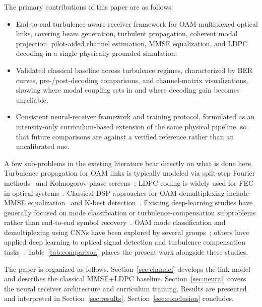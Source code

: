 \documentclass[journal]{IEEEtran}
\begin{document}
The primary contributions of this paper are as follows:
\begin{itemize}
\item End-to-end turbulence-aware receiver framework for OAM-multiplexed optical links, covering beam generation, turbulent propagation, coherent modal projection, pilot-aided channel estimation, MMSE equalization, and LDPC decoding in a single physically grounded simulation.

\item Validated classical baseline across turbulence regimes, characterized by BER curves, pre-/post-decoding comparisons, and channel-matrix visualizations, showing where modal coupling sets in and where decoding gain becomes unreliable.

\item Consistent neural-receiver framework and training protocol, formulated as an intensity-only curriculum-based extension of the same physical pipeline, so that future comparisons are against a verified reference rather than an uncalibrated one.
\end{itemize}

A few sub-problems in the existing literature bear directly on what is done here. Turbulence propagation for OAM links is typically modeled via split-step Fourier methods~\cite{schmidt2010numerical} and Kolmogorov phase screens~\cite{andrews2005laser}; LDPC coding is widely used for FEC in optical systems~\cite{richardson2008modern}. Classical DSP approaches for OAM demultiplexing include MMSE equalization~\cite{huang2014100} and K-best detection~\cite{ge2021oam}. Existing deep-learning studies have generally focused on mode classification or turbulence-compensation subproblems rather than end-to-end symbol recovery~\cite{liu2019oam_prl, doster2017machine, karanov2018endtoend, zhao2020cnn}. OAM mode classification and demultiplexing using CNNs have been explored by several groups~\cite{lohani2018turbulence, doster2017machine, arya2023oam}; others have applied deep learning to optical signal detection and turbulence compensation tasks~\cite{karanov2018endtoend, zhao2020cnn}. Table~\ref{tab:comparison} places the present work alongside these studies.

The paper is organized as follows. Section~\ref{sec:channel} develops the link model and describes the classical MMSE+LDPC baseline. Section~\ref{sec:neural} covers the neural receiver architecture and curriculum training. Results are presented and interpreted in Section~\ref{sec:results}. Section~\ref{sec:conclusion} concludes.
\end{document}
